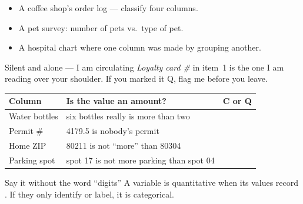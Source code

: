 \documentclass[aspectratio=169, 11pt]{beamer}
\begin{document}
\begin{frame}[t, plain]
  \begin{itemize}\setlength{\itemsep}{7pt}
    \item A coffee shop's order log --- classify four columns.
    \item A pet survey: number of pets vs.\ type of pet.
    \item A hospital chart where one column was made by grouping another.
  \end{itemize}
  \begin{block}{Silent and alone --- I am circulating}
    \emph{Loyalty card \#} in item~1 is the one I am reading over your shoulder. If you
    marked it Q, flag me before you leave.
  \end{block}
\end{frame}

\begin{frame}[t, plain]
  \vspace{2pt}
  \renewcommand{\arraystretch}{1.5}
  \begin{tabularx}{\textwidth}{@{} l X C{2.4cm} @{}}
    \hline
    \textbf{Column} & \textbf{Is the value an amount?} & \textbf{C or Q} \\
    \hline
    Water bottles & six bottles really is more than two          & \\
    Permit \#     & 4179.5 is nobody's permit                    & \\
    Home ZIP      & 80211 is not ``more'' than 80304             & \\
    Parking spot  & spot 17 is not more parking than spot 04     & \\
    \hline
  \end{tabularx}
  \vspace{8pt}
  \begin{block}{Say it without the word ``digits''}
    A variable is quantitative when its values record . If they
    only identify or label, it is categorical.
  \end{block}
\end{frame}
\end{document}
